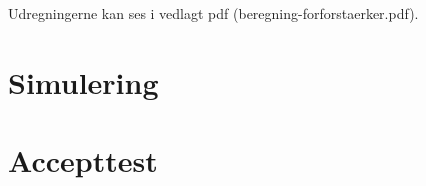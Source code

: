 Udregningerne kan ses i vedlagt pdf (beregning-forforstaerker.pdf). 


\section{Simulering}


\section{Accepttest}

